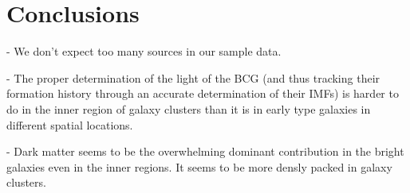 \chapter{Conclusions}

- We don't expect too many sources in our sample data.

- The proper determination of the light of the BCG (and thus tracking their formation history through an accurate determination of their IMFs) is harder to do in the inner region of galaxy clusters than it is in early type galaxies in different spatial locations. 

- Dark matter seems to be the overwhelming dominant contribution in the bright galaxies even in the inner regions. It seems to be more densly packed in galaxy clusters.

\newpage
{} 
